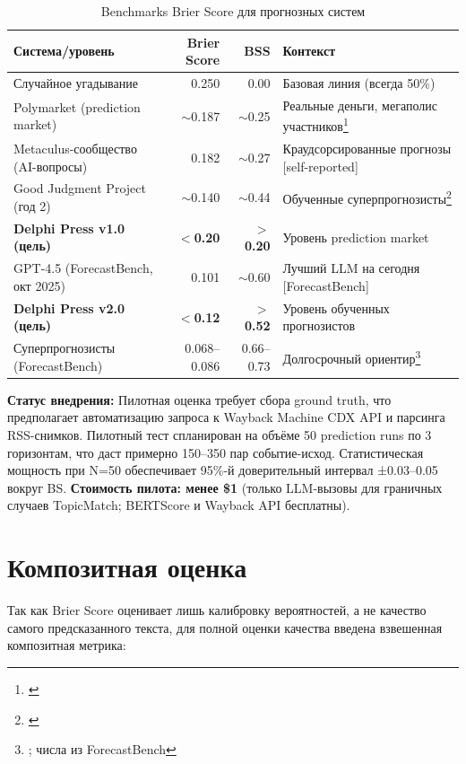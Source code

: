 \begin{table}[h!]
\centering
\caption{Benchmarks Brier Score для прогнозных систем}
\label{tab:brier_benchmarks}
\begin{tabular}{lrrl}
\toprule
\textbf{Система/уровень} & \textbf{Brier Score} & \textbf{BSS} & \textbf{Контекст} \\
\midrule
Случайное угадывание & 0.250 & 0.00 & Базовая линия (всегда 50\%) \\
Polymarket (prediction market) & $\sim$0.187 & $\sim$0.25 & Реальные деньги, мегаполис участников\footnote{\citep{clinton2024polymarket}} \\
Metaculus-сообщество (AI-вопросы) & 0.182 & $\sim$0.27 & Краудсорсированные прогнозы [self-reported] \\
Good Judgment Project (год 2) & $\sim$0.140 & $\sim$0.44 & Обученные суперпрогнозисты\footnote{\citep{tetlock2015superforecasting}} \\
\textbf{Delphi Press v1.0 (цель)} & \textbf{$<$0.20} & \textbf{$>$0.20} & Уровень prediction market \\
GPT-4.5 (ForecastBench, окт 2025) & 0.101 & $\sim$0.60 & Лучший LLM на сегодня [ForecastBench] \\
\textbf{Delphi Press v2.0 (цель)} & \textbf{$<$0.12} & \textbf{$>$0.52} & Уровень обученных прогнозистов \\
Суперпрогнозисты (ForecastBench) & 0.068--0.086 & 0.66--0.73 & Долгосрочный ориентир\footnote{\citep{tetlock2015superforecasting}; числа из ForecastBench} \\
\bottomrule
\end{tabular}
\end{table}

\textbf{Статус внедрения:} Пилотная оценка требует сбора ground truth, что предполагает автоматизацию запроса к Wayback Machine CDX API и парсинга RSS-снимков. Пилотный тест спланирован на объёме 50 prediction runs по 3 горизонтам, что даст примерно 150--350 пар событие-исход. Статистическая мощность при N=50 обеспечивает 95\%-й доверительный интервал ±0.03--0.05 вокруг BS. \textbf{Стоимость пилота: менее \$1} (только LLM-вызовы для граничных случаев TopicMatch; BERTScore и Wayback API бесплатны).


\section{Композитная оценка}

Так как Brier Score оценивает лишь калибровку вероятностей, а не качество самого предсказанного текста, для полной оценки качества введена взвешенная композитная метрика:

